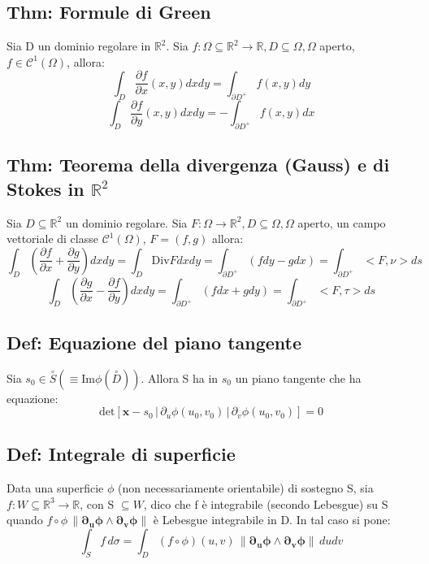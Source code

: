 \documentclass{article} %
\begin{document}
    \subsection*{Thm: Formule di Green}
    Sia D un dominio regolare in $\mathbb{R}^2$. Sia $f: \Omega \subseteq \mathbb{R}^2 \to \mathbb{R}, D \subseteq \Omega, \Omega$ aperto, $f \in \mathcal{C}^1(\Omega)$, allora: \\
    $$\int_D \frac{\partial f}{\partial x}(x,y) dx dy = \int_{\partial D^+} f(x,y) dy$$
    $$\int_D \frac{\partial f}{\partial y}(x,y) dx dy = - \int_{\partial D^+} f(x,y) dx$$

    \subsection*{Thm: Teorema della divergenza (Gauss) e di Stokes in $\mathbb{R}^2$}
    Sia $D \subseteq \mathbb{R}^2$ un dominio regolare. Sia $F: \Omega \to \mathbb{R} ^2, D \subseteq \Omega, \Omega$ aperto, un campo vettoriale di classe $\mathcal{C}^1(\Omega)$, $F=(f,g)$ allora: \\
    $$ \int_D \left( \frac{\partial f}{ \partial x} + \frac{\partial g}{ \partial y} \right) dx dy = \int_D \text{Div} F dx dy = \int_{\partial D^+} (f dy - g dx) = \int_{\partial D ^+} < F , \nu > ds $$
    $$ \int_D \left( \frac{\partial g}{ \partial x} - \frac{\partial f}{ \partial y} \right) dx dy = \int_{\partial D^+} (f dx + g dy) = \int_{\partial D ^+} < F , \tau > ds $$

    \subsection*{Def: Equazione del piano tangente}
    Sia $s_0 \in \overset{\circ}{S} \left(\equiv \text{Im} \phi\left(\overset{\circ}{D}\right)\right)$. Allora S ha in $s_0$ un piano tangente che ha equazione:
    $$ \text{det} \left[{ \mathbf{x}} - s_0 \, | \, \partial_u \phi (u_0, v_0) \, | \, \partial_v \phi (u_0, v_0) \right] = 0$$

    \subsection*{Def: Integrale di superficie}
    Data una superficie $\phi$ (non necessariamente orientabile) di sostegno S, sia $f: W \subseteq \mathbb{R}^3 \to \mathbb{R}$, con S $\subseteq W$, dico che f è integrabile (secondo Lebesgue) su S quando $f \circ \phi \, \lVert \mathbf{ \partial_u \phi \wedge \partial_v \phi} \rVert$ è Lebesgue integrabile in D. In tal caso si pone: 
    $$\int_S f \, d \sigma = \int_D (f \circ \phi) (u,v) \, \lVert \mathbf{ \partial_u \phi \wedge \partial_v \phi} \rVert \, du dv $$
\end{document}
